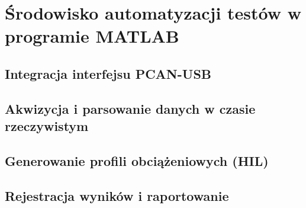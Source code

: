 \chapter{Środowisko automatyzacji testów w programie MATLAB}
\label{chap:matlab}

\section{Integracja interfejsu PCAN-USB}

\section{Akwizycja i parsowanie danych w czasie rzeczywistym}

\section{Generowanie profili obciążeniowych (HIL)}

\section{Rejestracja wyników i raportowanie}
